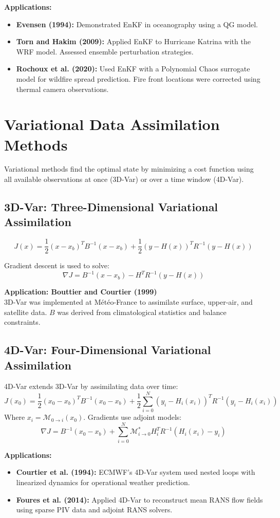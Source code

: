 \documentclass[a4paper]{article}
\begin{document}
\textbf{Applications:}
\begin{itemize}
  \item \textbf{Evensen (1994):} Demonstrated EnKF in oceanography using a QG model.
  \item \textbf{Torn and Hakim (2009):} Applied EnKF to Hurricane Katrina with the WRF model. Assessed ensemble perturbation strategies.
  \item \textbf{Rochoux et al. (2020):} Used EnKF with a Polynomial Chaos surrogate model for wildfire spread prediction. Fire front locations were corrected using thermal camera observations.
\end{itemize}

\section{Variational Data Assimilation Methods}

Variational methods find the optimal state by minimizing a cost function using all available observations at once (3D-Var) or over a time window (4D-Var).

\subsection{3D-Var: Three-Dimensional Variational Assimilation}

\[
J(x) = \frac{1}{2}(x - x_b)^T B^{-1}(x - x_b) + \frac{1}{2}(y - H(x))^T R^{-1}(y - H(x))
\]

Gradient descent is used to solve:
\[
\nabla J = B^{-1}(x - x_b) - H^T R^{-1}(y - H(x))
\]

\textbf{Application: Bouttier and Courtier (1999)}\\
3D-Var was implemented at Météo-France to assimilate surface, upper-air, and satellite data. $B$ was derived from climatological statistics and balance constraints.

\subsection{4D-Var: Four-Dimensional Variational Assimilation}

4D-Var extends 3D-Var by assimilating data over time:
\[
J(x_0) = \frac{1}{2}(x_0 - x_b)^T B^{-1}(x_0 - x_b) + \frac{1}{2} \sum_{i=0}^{N} (y_i - H_i(x_i))^T R^{-1} (y_i - H_i(x_i))
\]
Where $x_i = \mathcal{M}_{0 \rightarrow i}(x_0)$. Gradients use adjoint models:
\[
\nabla J = B^{-1}(x_0 - x_b) + \sum_{i=0}^{N} \mathcal{M}^*_{i \rightarrow 0} H_i^T R^{-1}(H_i(x_i) - y_i)
\]

\textbf{Applications:}
\begin{itemize}
  \item \textbf{Courtier et al. (1994):} ECMWF’s 4D-Var system used nested loops with linearized dynamics for operational weather prediction.
  \item \textbf{Foures et al. (2014):} Applied 4D-Var to reconstruct mean RANS flow fields using sparse PIV data and adjoint RANS solvers.
\end{itemize}

\printbibliography
\end{document}
